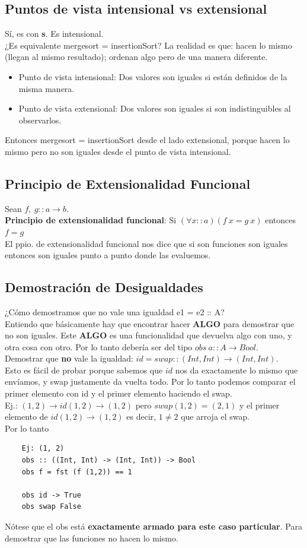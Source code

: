 \documentclass[10pt,a4paper]{article}
\begin{document}
\subsection*{Puntos de vista intensional vs extensional}
Sí, es con \textbf{s}. Es intensional. \\
¿Es equivalente mergesort = insertionSort? La realidad es que: hacen lo mismo (llegan al mismo resultado); ordenan algo pero de una manera diferente.
\begin{itemize}
    \item Punto de vista intensional: Dos valores son iguales si están definidos de la misma manera.
    \item Punto de vista extensional: Dos valores son iguales si son indistinguibles al observarlos.
\end{itemize}
Entonces mergesort = insertionSort desde el lado extensional, porque hacen lo mismo pero no son iguales desde el punto de vista intensional. 
\subsection*{Principio de Extensionalidad Funcional}
Sean $f, \ g :: a \rightarrow b$. \\
\textbf{Principio de extensionalidad funcional}: Si $(\forall x :: a)(f \ x  =  g \ x) $ entonces $f=g$ \\
El ppio. de extensionalidad funcional nos dice que si son funciones son iguales entonces son iguales punto a punto donde las evaluemos.
\subsection*{Demostración de Desigualdades}
¿Cómo demostramos que no vale una igualdad e1 = e2 :: A? \\
Entiendo que básicamente hay que encontrar hacer \textbf{ALGO} para demostrar que no son iguales. Este \textbf{ALGO} es una funcionalidad que devuelva algo con uno, y otra cosa con otro. Por lo tanto debería ser del tipo $obs \ a :: A \rightarrow Bool$. \\
Demostrar que \textbf{no} vale la igualdad: $id = swap :: (Int, Int) \rightarrow (Int, Int)$. \\
Esto es fácil de probar porque sabemos que $id$ nos da exactamente lo mismo que envíamos, y swap justamente da vuelta todo. Por lo tanto podemos comparar el primer elemento con id y el primer elemento haciendo el swap. \\
Ej.: $(1, 2) \rightarrow id (1, 2) \rightarrow (1, 2)$ pero $swap (1, 2) = (2, 1)$ y el primer elemento de $id (1, 2) \rightarrow (1, 2)$ es decir, $1 \neq 2$ que arroja el swap. \\
Por lo tanto
\begin{lstlisting}
    Ej: (1, 2)
    obs :: ((Int, Int) -> (Int, Int)) -> Bool 
    obs f = fst (f (1,2)) == 1

    obs id -> True 
    obs swap False
\end{lstlisting}
Nótese que el obs está \textbf{exactamente armado para este caso particular}. Para demostrar que las funciones no hacen lo mismo.
\end{document}
